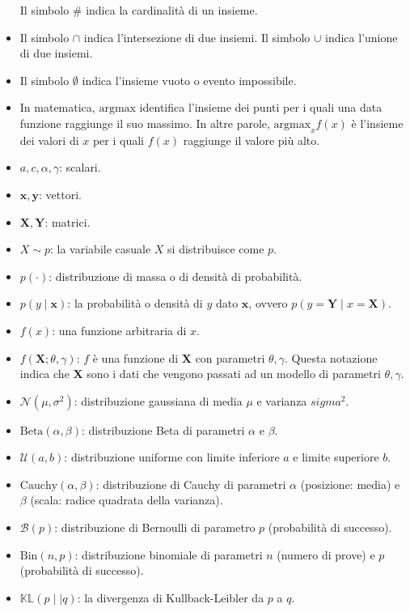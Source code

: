 \documentclass[
  11pt,
]{krantz}
\theoremstyle{definition}
\theoremstyle{definition}
\theoremstyle{definition}
\theoremstyle{definition}
\theoremstyle{remark}
\begin{document}
\begin{itemize}
  Il simbolo \(\#\) indica la cardinalità di un insieme.
\item
  Il simbolo \(\cap\) indica l'intersezione di due insiemi. Il simbolo \(\cup\) indica l'unione di due insiemi.
\item
  Il simbolo \(\emptyset\) indica l'insieme vuoto o evento impossibile.
\item
  In matematica, \(\mbox{argmax}\) identifica l'insieme dei punti per i quali una data funzione raggiunge il suo massimo. In altre parole, \(\mbox{argmax}_x f(x)\) è l'insieme dei valori di \(x\) per i quali \(f(x)\) raggiunge il valore più alto.
\item
  \(a, c, \alpha, \gamma\): scalari.
\item
  \(\boldsymbol{x}, \boldsymbol{y}\): vettori.
\item
  \(\boldsymbol{X}, \boldsymbol{Y}\): matrici.
\item
  \(X \sim p\): la variabile casuale \(X\) si distribuisce come \(p\).
\item
  \(p(\cdot)\): distribuzione di massa o di densità di probabilità.
\item
  \(p(y \mid \boldsymbol{x})\): la probabilità o densità di \(y\) dato \(\boldsymbol{x}\), ovvero \(p(y = \boldsymbol{Y} \mid x = \boldsymbol{X})\).
\item
  \(f(x)\): una funzione arbitraria di \(x\).
\item
  \(f(\boldsymbol{X}; \theta, \gamma)\): \(f\) è una funzione di \(\boldsymbol{X}\) con parametri \(\theta, \gamma\). Questa notazione indica che \(\boldsymbol{X}\) sono i dati che vengono passati ad un modello di parametri \(\theta, \gamma\).
\item
  \(\mathcal{N}(\mu, \sigma^2)\): distribuzione gaussiana di media \(\mu\) e varianza \(sigma^2\).
\item
  \(\mbox{Beta}(\alpha, \beta)\): distribuzione Beta di parametri \(\alpha\) e \(\beta\).
\item
  \(\mathcal{U}(a, b)\): distribuzione uniforme con limite inferiore \(a\) e limite superiore \(b\).
\item
  \(\mbox{Cauchy}(\alpha, \beta)\): distribuzione di Cauchy di parametri \(\alpha\) (posizione: media) e \(\beta\) (scala: radice quadrata della varianza).
\item
  \(\mathcal{B}(p)\): distribuzione di Bernoulli di parametro \(p\) (probabilità di successo).
\item
  \(\mbox{Bin}(n, p)\): distribuzione binomiale di parametri \(n\) (numero di prove) e \(p\) (probabilità di successo).
\item
  \(\mathbb{KL} (p \mid\mid q)\): la divergenza di Kullback-Leibler da \(p\) a \(q\).
\end{itemize}
\end{document}
